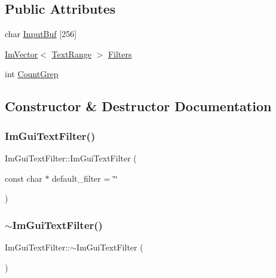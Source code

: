 \subsection*{Public Attributes}
\begin{DoxyCompactItemize}
\item 
char \hyperlink{struct_im_gui_text_filter_ad070acb1038199dd4e8f5d010c5cb5ba}{Input\+Buf} \mbox{[}256\mbox{]}
\item 
\hyperlink{class_im_vector}{Im\+Vector}$<$ \hyperlink{struct_im_gui_text_filter_1_1_text_range}{Text\+Range} $>$ \hyperlink{struct_im_gui_text_filter_a5a930a339a9384e6bfadfa56a7c111fd}{Filters}
\item 
int \hyperlink{struct_im_gui_text_filter_ac31839c319fe4211c21fc143b7249f86}{Count\+Grep}
\end{DoxyCompactItemize}


\subsection{Constructor \& Destructor Documentation}
\hypertarget{struct_im_gui_text_filter_a0a61ee76f0b4f3c354791734b06e3140}{}\label{struct_im_gui_text_filter_a0a61ee76f0b4f3c354791734b06e3140} 
\subsubsection{\texorpdfstring{Im\+Gui\+Text\+Filter()}{ImGuiTextFilter()}}
{\footnotesize\ttfamily Im\+Gui\+Text\+Filter\+::\+Im\+Gui\+Text\+Filter (\begin{DoxyParamCaption}\item[{const char $\ast$}]{default\+\_\+filter = {\ttfamily \char`\"{}\char`\"{}} }\end{DoxyParamCaption})}

\hypertarget{struct_im_gui_text_filter_acaf7fdcdc879c7938d195714609aac87}{}\label{struct_im_gui_text_filter_acaf7fdcdc879c7938d195714609aac87} 
\subsubsection{\texorpdfstring{$\sim$\+Im\+Gui\+Text\+Filter()}{~ImGuiTextFilter()}}
{\footnotesize\ttfamily Im\+Gui\+Text\+Filter\+::$\sim$\+Im\+Gui\+Text\+Filter (\begin{DoxyParamCaption}{ }\end{DoxyParamCaption})}



